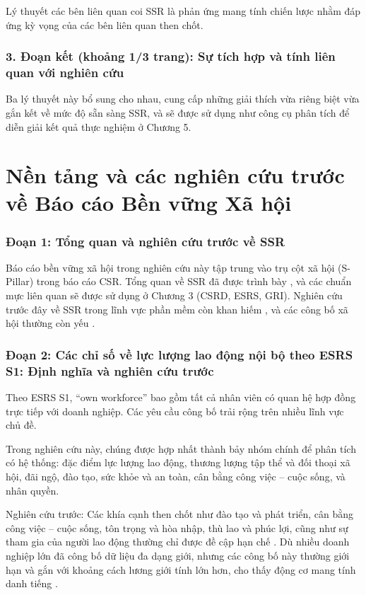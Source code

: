 Lý thuyết các bên liên quan \parencite{Freeman1984} coi SSR là phản ứng mang tính chiến lược nhằm đáp ứng kỳ vọng của các bên liên quan then chốt.

\subsubsection{3. Đoạn kết (khoảng 1/3 trang): Sự tích hợp và tính liên quan với nghiên cứu}

Ba lý thuyết này bổ sung cho nhau, cung cấp những giải thích vừa riêng biệt vừa gắn kết về mức độ sẵn sàng SSR, và sẽ được sử dụng như công cụ phân tích để diễn giải kết quả thực nghiệm ở Chương 5.

\section{Nền tảng và các nghiên cứu trước về Báo cáo Bền vững Xã hội}

\subsubsection{Đoạn 1: Tổng quan và nghiên cứu trước về SSR}

Báo cáo bền vững xã hội trong nghiên cứu này tập trung vào trụ cột xã hội (S-Pillar) trong báo cáo CSR.
Tổng quan về SSR đã được trình bày \parencite{Edge2022,Fiechter2022}, và các chuẩn mực liên quan \parencite{Dechow2023} sẽ được sử dụng ở Chương 3 (CSRD, ESRS, GRI).
Nghiên cứu trước đây về SSR trong lĩnh vực phần mềm còn khan hiếm \parencite{Ye2020,Afshari2022}, và các công bố xã hội thường còn yếu \parencite{Christensen2021,Reitmaier2024}.

\subsubsection{Đoạn 2: Các chỉ số về lực lượng lao động nội bộ theo ESRS S1: Định nghĩa và nghiên cứu trước}

Theo ESRS S1, “own workforce” bao gồm tất cả nhân viên có quan hệ hợp đồng trực tiếp với doanh nghiệp.
Các yêu cầu công bố trải rộng trên nhiều lĩnh vực chủ đề.

Trong nghiên cứu này, chúng được hợp nhất thành bảy nhóm chính để phân tích có hệ thống: đặc điểm lực lượng lao động, thương lượng tập thể và đối thoại xã hội, đãi ngộ, đào tạo, sức khỏe và an toàn, cân bằng công việc – cuộc sống, và nhân quyền.

Nghiên cứu trước: Các khía cạnh then chốt như đào tạo và phát triển, cân bằng công việc – cuộc sống, tôn trọng và hòa nhập, thù lao và phúc lợi, cũng như sự tham gia của người lao động thường chỉ được đề cập hạn chế \parencite{Greig2021}.
Dù nhiều doanh nghiệp lớn đã công bố dữ liệu đa dạng giới, nhưng các công bố này thường giới hạn và gắn với khoảng cách lương giới tính lớn hơn, cho thấy động cơ mang tính danh tiếng \parencite{Huang2022}.

